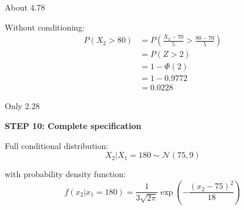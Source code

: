 \documentclass[12pt]{article}
\begin{document}
\begin{solution}
About 4.78%

Without conditioning:
\begin{align*}
P(X_2 > 80) &= P\left(\frac{X_2 - 70}{5} > \frac{80 - 70}{5}\right) \\
&= P(Z > 2) \\
&= 1 - \Phi(2) \\
&= 1 - 0.9772 \\
&= 0.0228
\end{align*}

Only 2.28%

\textbf{STEP 10: Complete specification}

Full conditional distribution:
\[
\boxed{X_2 | X_1 = 180 \sim \mathcal{N}(75, 9)}
\]

with probability density function:
\[
f(x_2 | x_1 = 180) = \frac{1}{3\sqrt{2\pi}}\exp\left(-\frac{(x_2 - 75)^2}{18}\right)
\]

\end{solution}
\end{document}
